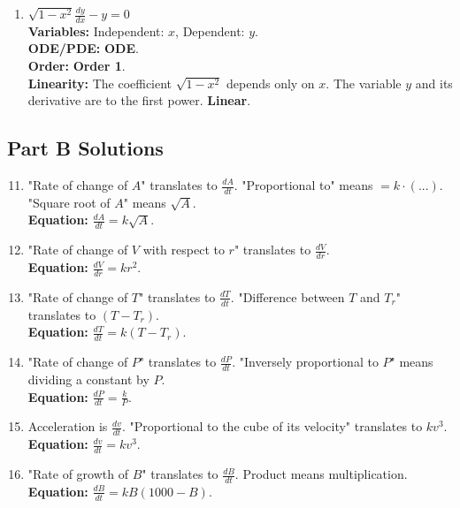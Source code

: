 \documentclass{article}
\begin{document}
\begin{enumerate}
    \item $\sqrt{1 - x^2} \frac{dy}{dx} - y = 0$ \\
    \textbf{Variables:} Independent: $x$, Dependent: $y$. \\
    \textbf{ODE/PDE:} \textbf{ODE}. \\
    \textbf{Order:} \textbf{Order 1}. \\
    \textbf{Linearity:} The coefficient $\sqrt{1-x^2}$ depends only on $x$. The variable $y$ and its derivative are to the first power. \textbf{Linear}.
\end{enumerate}

\subsection*{Part B Solutions}
\begin{enumerate}
    \setcounter{enumi}{10}
    \item "Rate of change of $A$" translates to $\frac{dA}{dt}$. "Proportional to" means $= k \cdot (...)$. "Square root of $A$" means $\sqrt{A}$. \\
    \textbf{Equation:} $\frac{dA}{dt} = k\sqrt{A}$.
    
    \item "Rate of change of $V$ with respect to $r$" translates to $\frac{dV}{dr}$. \\
    \textbf{Equation:} $\frac{dV}{dr} = k r^2$.
    
    \item "Rate of change of $T$" translates to $\frac{dT}{dt}$. "Difference between $T$ and $T_r$" translates to $(T - T_r)$. \\
    \textbf{Equation:} $\frac{dT}{dt} = k(T - T_r)$.
    
    \item "Rate of change of $P$" translates to $\frac{dP}{dt}$. "Inversely proportional to $P$" means dividing a constant by $P$. \\
    \textbf{Equation:} $\frac{dP}{dt} = \frac{k}{P}$.
    
    \item Acceleration is $\frac{dv}{dt}$. "Proportional to the cube of its velocity" translates to $k v^3$. \\
    \textbf{Equation:} $\frac{dv}{dt} = k v^3$.
    
    \item "Rate of growth of $B$" translates to $\frac{dB}{dt}$. Product means multiplication. \\
    \textbf{Equation:} $\frac{dB}{dt} = k B(1000 - B)$.
\end{enumerate}
\end{document}
